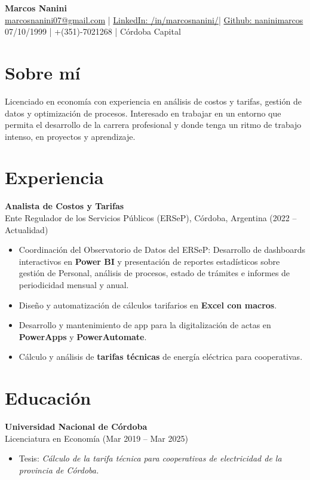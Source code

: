 \documentclass[a4paper,10pt]{article}
\begin{document}
\begin{center}
    {\LARGE \textbf{Marcos Nanini}} \\[5pt]
    \href{mailto:marcosnanini07@gmail.com}{marcosnanini07@gmail.com} \quad | \quad
    \href{https://www.linkedin.com/in/marcosnanini/}{LinkedIn: /in/marcosnanini/}\quad | \quad
    \href{https://github.com/naninimarcos/Proyectos_2024-2025}{Github: naninimarcos}
\\[5pt]
    07/10/1999 \quad | \quad +(351)-7021268 | \quad Córdoba Capital
\end{center}

\section*{Sobre mí}
Licenciado en econom\'ia con experiencia en an\'alisis de costos y tarifas, gesti\'on de datos y optimizaci\'on de procesos. Interesado en trabajar en un entorno que permita el desarrollo de la carrera profesional y donde tenga un ritmo de trabajo intenso, en proyectos y aprendizaje.
\section*{Experiencia}
\textbf{Analista de Costos y Tarifas} \\
Ente Regulador de los Servicios P\'ublicos (ERSeP), C\'ordoba, Argentina (2022 – Actualidad)
\begin{itemize}
    \item Coordinaci\'on del Observatorio de Datos del ERSeP: Desarrollo de dashboards interactivos en \textbf{Power BI} y presentaci\'on de reportes estad\'isticos sobre gesti\'on de Personal, an\'alisis de procesos, estado de tr\'amites e informes de periodicidad mensual y anual.
    \item Dise\~no y automatizaci\'on de c\'alculos tarifarios en \textbf{Excel con macros}.
    \item Desarrollo y mantenimiento de app para la digitalizaci\'on de actas en\textbf{ PowerApps} y \textbf{PowerAutomate}.
    \item C\'alculo y análisis de \textbf{tarifas t\'ecnicas} de energ\'ia el\'ectrica para cooperativas.
\end{itemize}

\section*{Educaci\'on}
\textbf{Universidad Nacional de C\'ordoba} \\
Licenciatura en Econom\'ia (Mar 2019 – Mar 2025)
\begin{itemize}
    \item Tesis: \textit{C\'alculo de la tarifa t\'ecnica para cooperativas de electricidad de la provincia de C\'ordoba.}
\end{itemize}
\end{document}
